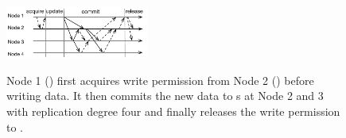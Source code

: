 {
\begin{figure}[th]
\begin{center}
\centerline{\includegraphics[width=0.42\textwidth]{Figures/mrsw.pdf}}
{
Node 1 (\xn) first acquires write permission from Node 2 (\master)
before writing data.
It then commits the new data to \on{}s at Node 2 and 3 with replication degree four
and finally releases the write permission to \master.
}
\end{center}
\end{figure}
}
